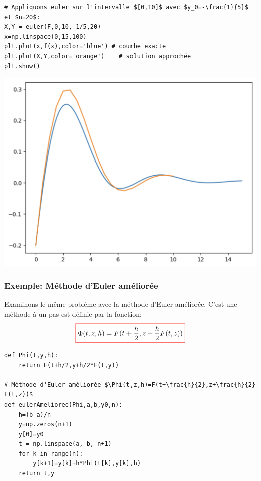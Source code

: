 \documentclass{beamer}
\newcommand{\myredbox}[1]{\fcolorbox{red}{white}{$\displaystyle#1$}}
\begin{document}

  
  \begin{frame}[fragile]
  
  \begin{verbatim}
# Appliquons euler sur l'intervalle $[0,10]$ avec $y_0=-\frac{1}{5}$ et $n=20$:
X,Y = euler(F,0,10,-1/5,20)
x=np.linspace(0,15,100)
plt.plot(x,f(x),color='blue') # courbe exacte
plt.plot(X,Y,color='orange')    # solution approchée 
plt.show()
\end{verbatim}
  
\begin{center}
\includegraphics[scale=0.35]{CaptureEquadiff03.png} 
\end{center}

\end{frame}




\begin{frame}[fragile]
 \frametitle{Exemple: Méthode d'Euler améliorée}
Examinons le même problème avec la méthode d'Euler améliorée. C'est une méthode à un pas est définie par la fonction:
\[\myredbox{\Phi(t,z,h)=F(t+\frac h{2},z+\frac h{2} F(t,z))}\]
\begin{verbatim}
def Phi(t,y,h):
    return F(t+h/2,y+h/2*F(t,y))
    
# Méthode d'Euler améliorée $\Phi(t,z,h)=F(t+\frac{h}{2},z+\frac{h}{2} F(t,z))$
def eulerAmelioree(Phi,a,b,y0,n):
    h=(b-a)/n
    y=np.zeros(n+1)
    y[0]=y0
    t = np.linspace(a, b, n+1)
    for k in range(n):
        y[k+1]=y[k]+h*Phi(t[k],y[k],h)
    return t,y

\end{verbatim}

\end{frame}
\end{document}
